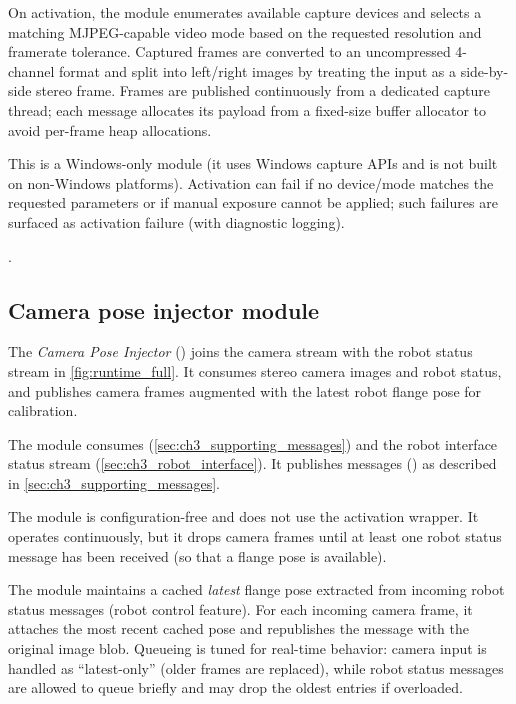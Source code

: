 On activation, the module enumerates available capture devices and selects a matching MJPEG-capable video mode based on the requested resolution and framerate tolerance.
Captured frames are converted to an uncompressed 4-channel format and split into left/right images by treating the input as a side-by-side stereo frame.
Frames are published continuously from a dedicated capture thread; each message allocates its payload from a fixed-size buffer allocator to avoid per-frame heap allocations.

This is a Windows-only module (it uses Windows capture APIs and is not built on non-Windows platforms).
Activation can fail if no device/mode matches the requested parameters or if manual exposure cannot be applied; such failures are surfaced as activation failure (with diagnostic logging).

.

\subsection{Camera pose injector module}
\label{subsec:ch4_mod_pose_injector}

The \emph{Camera Pose Injector} () joins the camera stream with the robot status stream in \autoref{fig:runtime_full}.
It consumes stereo camera images and robot status, and publishes camera frames augmented with the latest robot flange pose for calibration.

The module consumes  (\autoref{sec:ch3_supporting_messages}) and the robot interface status stream (\autoref{sec:ch3_robot_interface}).
It publishes  messages () as described in \autoref{sec:ch3_supporting_messages}.

The module is configuration-free and does not use the activation wrapper.
It operates continuously, but it drops camera frames until at least one robot status message has been received (so that a flange pose is available).

The module maintains a cached \emph{latest} flange pose extracted from incoming robot status messages (robot control feature).
For each incoming camera frame, it attaches the most recent cached pose and republishes the message with the original image blob.
Queueing is tuned for real-time behavior: camera input is handled as ``latest-only'' (older frames are replaced), while robot status messages are allowed to queue briefly and may drop the oldest entries if overloaded.

